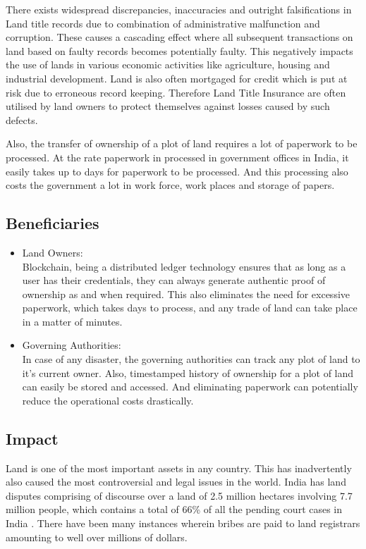 \documentclass[conference]{IEEEtran}
\begin{document}
There exists widespread discrepancies, inaccuracies and outright falsifications in Land title records due to combination of administrative malfunction and corruption. These causes a cascading effect where all subsequent transactions on land based on faulty records becomes potentially faulty. This negatively impacts the use of lands in various economic activities like agriculture, housing and industrial development. Land is also often mortgaged for credit which is put at risk due to erroneous record keeping. Therefore Land Title Insurance are often utilised by land owners to protect themselves against losses caused by such defects.

Also, the transfer of ownership of a plot of land requires a lot of paperwork to be processed. At the rate paperwork in processed in government offices in India, it easily takes up to days for paperwork to be processed. And this processing also costs the government a lot in work force, work places and storage of papers.

\subsection{Beneficiaries}
\begin{itemize}
    \item Land Owners:\\Blockchain, being a distributed ledger technology ensures that as long as a user has their credentials, they can always generate authentic proof of ownership as and when required. This also eliminates the need for excessive paperwork, which takes days to process, and any trade of land can take place in a matter of minutes.
    \item Governing Authorities:\\In case of any disaster, the governing authorities can track any plot of land to it's current owner. Also, timestamped history of ownership for a plot of land can easily be stored and accessed. And eliminating paperwork can potentially reduce the operational costs drastically.
\end{itemize}

\subsection{Impact}
Land is one of the most important assets in any country. This has inadvertently also caused the most controversial and legal issues in the world. India has land disputes comprising of discourse over a land of 2.5 million hectares involving 7.7 million people, which contains a total of 66\% of all the pending court cases in India \cite{b3}. There have been many instances wherein bribes are paid to land registrars amounting to well over millions of dollars.
\end{document}
